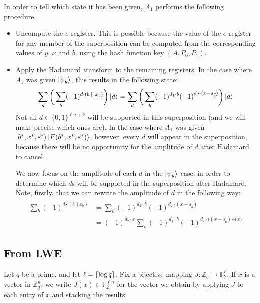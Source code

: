 \documentclass{article}
\DeclarePairedDelimiter{\ceil}{\lceil}{\rceil}
\begin{document}
In order to tell which state it has been given, $A_1$ performs the following procedure.
\begin{itemize}
    \item Uncompute the $e$ register. This is possible because the value of the $e$ register for any member of the superposition can be computed from the corresponding values of $y$, $x$ and $b$, using the hash function key $(A, P_0, P_1)$.
    \item Apply the Hadamard transform to the remaining registers. In the case where $A_1$ was given $\ket{\psi_y}$, this results in the following state:
    \begin{align}
        \sum_d \bigg( \sum_b (-1)^{d \cdot (b \: || \: x_b)} \bigg) \ket{d} = \sum_d \bigg( \sum_b (-1)^{d_1 \cdot b} (-1)^{d_2 \cdot (x - s_{\widetilde{b}})} \bigg) \ket{d}
    \end{align}
    Not all $d \in \{0,1\}^{\ell n + k}$ will be supported in this superposition (and we will make precise which ones are). In the case where $A_1$ was given $\ket{b^*, x^*, e^*} \ket{F(b^*, x^*, e^*)}$, however, every $d$ will appear in the superposition, because there will be no opportunity for the amplitude of $d$ after Hadamard to cancel.
    
    We now focus on the amplitude of each $d$ in the $\ket{\psi_y}$ case, in order to determine which $d$s will be supported in the superposition after Hadamard. Note, firstly, that we can rewrite the amplitude of $d$ in the following way:
    \begin{align}
    \begin{split}
        \sum_b (-1)^{d \cdot (b \: || \: x_b)} &= \sum_b (-1)^{d_1 \cdot b} (-1)^{d_2 \cdot (x - s_{\widetilde{b}})} \\
        &= (-1)^{d_2 \cdot x} \sum_b (-1)^{d_1 \cdot b} (-1)^{d_2 \cdot \big( (x - s_{\widetilde{b}}) \oplus x \big)}
    \end{split}
    \end{align}
\end{itemize}

\subsection{From LWE}

Let $q$ be a prime, and let $\ell = \ceil*{\log q}$. Fix a bijective mapping $J : \mathbb{Z}_q \rightarrow \mathbb{F}^\ell_2$. If $x$ is a vector in $\mathbb{Z}_q^n$, we write $J(x) \in \mathbb{F}^{\ell n}_2$ for the vector we obtain by applying $J$ to each entry of $x$ and stacking the results.
\end{document}
